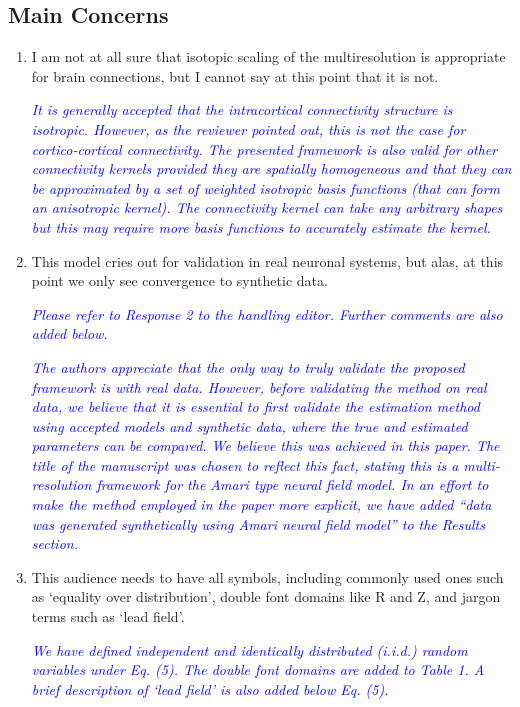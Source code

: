\documentclass{article}
\newcommand{\parham}[1]{\textcolor{blue}{#1}}
\begin{document}
    \subsection{Main Concerns}
		\begin{enumerate} 
			\item I am not at all sure that isotopic scaling of the multiresolution is appropriate for brain connections, but I cannot say at this point that it is not.
			
			\emph{\parham{It is generally accepted that the intracortical connectivity structure is isotropic. However, as the reviewer pointed out, this is not the case for cortico-cortical connectivity. The presented framework is also valid for other connectivity kernels provided they are spatially homogeneous and that they can be approximated by a set of weighted isotropic basis functions (that can form an anisotropic kernel). The connectivity kernel can take any arbitrary shapes but this may require more basis functions to accurately estimate the kernel.}}
			 
			\item This model cries out for validation in real neuronal systems, but alas, at this point we only see convergence to synthetic data.   
			  
			 \emph{\parham{Please refer to Response 2 to the handling editor. Further comments are also added below.}}
			
			 \emph{\parham{The authors appreciate that the only way to truly validate the proposed framework is with real data. However, before validating the method on real data, we believe that it is essential to first validate the estimation method using accepted models and synthetic data, where the true and estimated parameters can be compared. We believe this was achieved in this paper. The title of the manuscript was chosen to reflect this fact, stating this is a multi-resolution framework for the Amari type neural field model. In an effort to make the method employed in the paper more explicit, we have added ``data was generated synthetically using Amari neural field model'' to the Results section.}}  
			
			\item This audience needs to have all symbols, including commonly used ones such as `equality over distribution', double font domains like R and Z, and jargon terms such as `lead field'.
			
			\emph{\parham{ We have defined independent and identically distributed (i.i.d.) random variables under Eq. (5). The double font domains are added to Table 1. A brief description of `lead field' is also added below Eq. (5).}}  
			

\end{enumerate}
\end{document}

